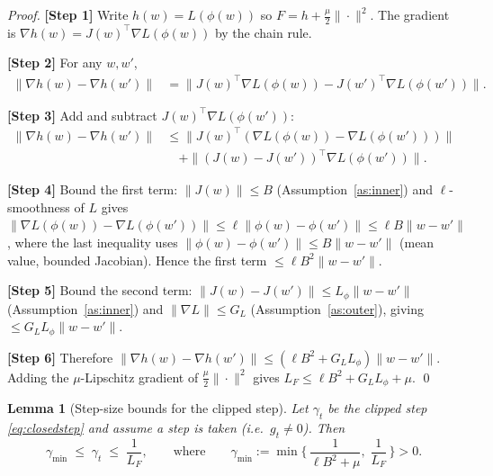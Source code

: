 \documentclass[11pt]{article}
\newtheorem{lemma}{Lemma}
\begin{document}
\begin{proof}
\textbf{[Step 1]} Write $h(w)=L(\phi(w))$ so $F = h + \tfrac{\mu}{2}\|\cdot\|^2$.
The gradient is $\nabla h(w) = J(w)^\top \nabla L(\phi(w))$ by the chain rule.

\textbf{[Step 2]} For any $w,w'$,
\begin{align*}
\|\nabla h(w) - \nabla h(w')\|
&= \big\| J(w)^\top \nabla L(\phi(w)) - J(w')^\top \nabla L(\phi(w')) \big\|.
\end{align*}

\textbf{[Step 3]} Add and subtract $J(w)^\top \nabla L(\phi(w'))$:
\begin{align*}
\|\nabla h(w) - \nabla h(w')\|
&\le \| J(w)^\top (\nabla L(\phi(w)) - \nabla L(\phi(w'))) \|\\
&\quad + \|(J(w)-J(w'))^\top \nabla L(\phi(w'))\|.
\end{align*}

\textbf{[Step 4]} Bound the first term: $\|J(w)\|\le B$ (Assumption~\ref{as:inner})
and $\ell$-smoothness of $L$ gives
$\|\nabla L(\phi(w))-\nabla L(\phi(w'))\| \le \ell\|\phi(w)-\phi(w')\|
\le \ell B\|w-w'\|$, where the last inequality uses
$\|\phi(w)-\phi(w')\|\le B\|w-w'\|$ (mean value, bounded Jacobian).
Hence the first term $\le \ell B^2 \|w-w'\|$.

\textbf{[Step 5]} Bound the second term: $\|J(w)-J(w')\|\le L_\phi\|w-w'\|$
(Assumption~\ref{as:inner}) and $\|\nabla L\|\le G_L$ (Assumption~\ref{as:outer}),
giving $\le G_L L_\phi \|w-w'\|$.

\textbf{[Step 6]} Therefore
$\|\nabla h(w)-\nabla h(w')\| \le (\ell B^2 + G_L L_\phi)\|w-w'\|$.
Adding the $\mu$-Lipschitz gradient of $\tfrac{\mu}{2}\|\cdot\|^2$ gives
$L_F \le \ell B^2 + G_L L_\phi + \mu$. \qed
\end{proof}

\begin{lemma}[Step-size bounds for the clipped step]\label{lem:stepbound}
Let $\gamma_t$ be the clipped step \eqref{eq:closedstep} and assume a step is
taken (i.e.\ $g_t\ne 0$). Then
\[
\gamma_{\min} \;\le\; \gamma_t \;\le\; \frac{1}{L_F},
\qquad\text{where}\qquad
\gamma_{\min} := \min\Big\{\, \frac{1}{\ell B^2 + \mu},\; \frac{1}{L_F} \,\Big\} > 0 .
\]
\end{lemma}
\end{document}
